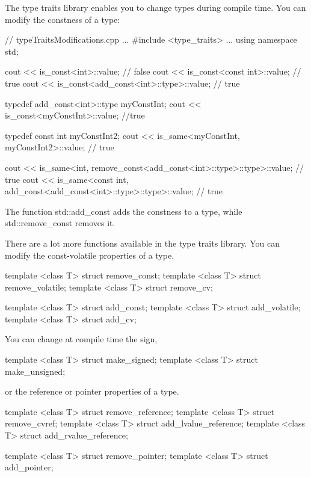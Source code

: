 
The type traits library enables you to change types during compile time. You can modify the constness of a type:


\begin{cpp}
// typeTraitsModifications.cpp
...
#include <type_traits>
...
using namespace std;

cout << is_const<int>::value; // false
cout << is_const<const int>::value; // true
cout << is_const<add_const<int>::type>::value; // true

typedef add_const<int>::type myConstInt;
cout << is_const<myConstInt>::value; //true

typedef const int myConstInt2;
cout << is_same<myConstInt, myConstInt2>::value; // true

cout << is_same<int, remove_const<add_const<int>::type>::type>::value; // true
cout << is_same<const int, add_const<add_const<int>::type>::type>::value; // true
\end{cpp}

The function std::add\_const adds the constness to a type, while std::remove\_const removes it.

There are a lot more functions available in the type traits library. You can modify the const-volatile properties of a type.

\begin{cpp}
template <class T> struct remove_const;
template <class T> struct remove_volatile;
template <class T> struct remove_cv;

template <class T> struct add_const;
template <class T> struct add_volatile;
template <class T> struct add_cv;
\end{cpp}

You can change at compile time the sign,

\begin{cpp}
template <class T> struct make_signed;
template <class T> struct make_unsigned;
\end{cpp}

or the reference or pointer properties of a type.

\begin{cpp}
template <class T> struct remove_reference;
template <class T> struct remove_cvref;
template <class T> struct add_lvalue_reference;
template <class T> struct add_rvalue_reference;

template <class T> struct remove_pointer;
template <class T> struct add_pointer;
\end{cpp}

